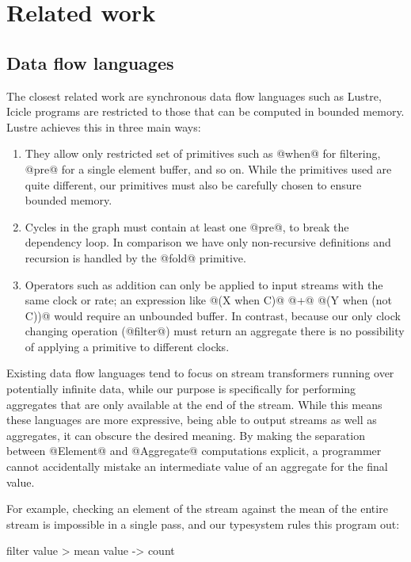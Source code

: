 \section{Related work}
\label{s:Related}
\subsection{Data flow languages}

The closest related work are synchronous data flow languages such as {\sc Lustre}, Icicle programs are restricted to those that can be computed in bounded memory.
{\sc Lustre}\cite{halbwachs1991synchronous} achieves this in three main ways:

\begin{enumerate}
\item They allow only restricted set of primitives such as @when@ for filtering, @pre@ for a single element buffer, and so on.
While the primitives used are quite different, our primitives must also be carefully chosen to ensure bounded memory.
\item Cycles in the graph must contain at least one @pre@, to break the dependency loop.
In comparison we have only non-recursive definitions and recursion is handled by the @fold@ primitive.
\item Operators such as addition can only be applied to input streams with the same clock or rate; an expression like @(X when C)@ @+@ @(Y when (not C))@ would require an unbounded buffer.
In contrast, because our only clock changing operation (@filter@) must return an aggregate there is no possibility of applying a primitive to different clocks.
\end{enumerate}

Existing data flow languages tend to focus on stream transformers running over potentially infinite data, while our purpose is specifically for performing aggregates that are only available at the end of the stream.
While this means these languages are more expressive, being able to output streams as well as aggregates, it can obscure the desired meaning.
By making the separation between @Element@ and @Aggregate@ computations explicit, a programmer cannot accidentally mistake an intermediate value of an aggregate for  the final value.

For example, checking an element of the stream against the mean of the entire stream is impossible in a single pass, and our typesystem rules this program out:
\begin{code}
   filter value > mean value
-> count
\end{code}


